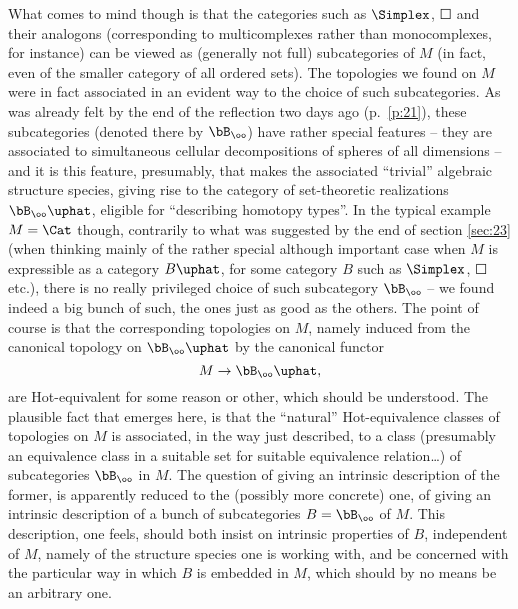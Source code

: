 %
\label{sec:26}%
What comes to mind though is that the categories such as $\Simplex$,
$\Square$ and their analogons (corresponding to multicomplexes rather
than monocomplexes, for instance) can be viewed as (generally not
full) subcategories of $M$ (in fact, even of the smaller category
\Ord{} of all ordered sets). The topologies we found on $M$ were in
fact associated in an evident way to the choice of such
subcategories. As was already felt by the end of the reflection two
days ago (p.~\ref{p:21}),
these subcategories (denoted there by $\bB_\oo$)
have rather special features -- they are associated to simultaneous
cellular decompositions of spheres of all dimensions -- and it is this
feature, presumably, that makes the associated ``trivial'' algebraic
structure species, giving rise to the category of set-theoretic
realizations $\bB_\oo\uphat$, eligible for ``describing
homotopy types''. In the typical example $M = \Cat$ though,
contrarily to what was suggested by the end of section \ref{sec:23}
(when thinking mainly of
the rather special although important case when $M$ is expressible as
a category $B\uphat$, for some category $B$ such as
$\Simplex$, $\Square$ etc.), there is no really privileged choice of
such subcategory $\bB_\oo$ -- we found indeed a big bunch of such,
the ones just as good as the others. The point of course is that the
corresponding topologies on $M$, namely induced from the canonical
topology on $\bB_\oo\uphat$ by the canonical functor
\[ M \to \bB_\oo\uphat,\]
are Hot-equivalent for some reason or other, which should be
understood. The plausible fact that emerges here, is that the
``natural'' Hot-equivalence classes of topologies on $M$ is
associated, in the way just described, to a class (presumably an
equivalence class in a suitable set for suitable equivalence
relation\ldots) of subcategories $\bB_\oo$ in $M$. The question of
giving an intrinsic description of the former, is apparently reduced
to the (possibly more concrete) one, of giving an intrinsic
description of a bunch of subcategories $B=\bB_\oo$ of $M$. This
description, one feels, should both \enspace
insist on intrinsic properties of $B$, independent of $M$, namely of
the structure species one is working with, and
\enspace be concerned with the particular
way in which $B$ is embedded in $M$, which should by no means be an
arbitrary one.

